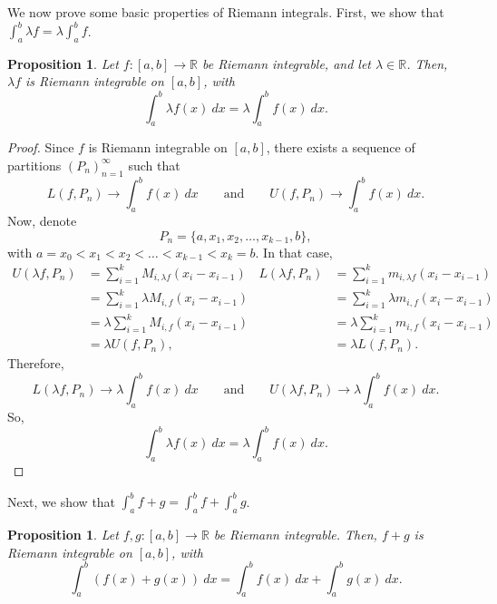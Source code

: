 \documentclass[a4paper, openany]{memoir}
\theoremstyle{definition}
\theoremstyle{plain}
\newtheorem{proposition}[definition]{Proposition}
\begin{document}
We now prove some basic properties of Riemann integrals. First, we show that $\int_a^b \lambda f = \lambda \int_a^b f$.
\begin{proposition}
Let $f: [a, b] \to \mathbb{R}$ be Riemann integrable, and let $\lambda \in \mathbb{R}$. Then, $\lambda f$ is Riemann integrable on $[a, b]$, with
\[\int_a^b \lambda f(x) \ dx = \lambda \int_a^b f(x) \ dx.\]
\end{proposition}
\begin{proof}
Since $f$ is Riemann integrable on $[a, b]$, there exists a sequence of partitions $(P_n)_{n=1}^{\infty}$ such that
\[L(f, P_n) \to \int_a^b f(x) \ dx \qquad \text{and} \qquad U(f, P_n) \to \int_a^b f(x) \ dx.\]
Now, denote
\[P_n = \{a, x_1, x_2, \dots, x_{k-1}, b\},\]
with $a = x_0 < x_1 < x_2 < \dots < x_{k-1} < x_k = b$. In that case,
\begin{align*}
    U(\lambda f, P_n) &= \sum_{i=1}^k M_{i, \lambda f} (x_i - x_{i-1}) & L(\lambda f, P_n) &= \sum_{i=1}^k m_{i, \lambda f} (x_i - x_{i-1}) \\
    &= \sum_{i=1}^k \lambda M_{i, f} (x_i - x_{i-1}) & &= \sum_{i=1}^k \lambda m_{i, f} (x_i - x_{i-1}) \\
    &= \lambda \sum_{i=1}^k M_{i, f} (x_i - x_{i-1}) & &= \lambda \sum_{i=1}^k m_{i, f} (x_i - x_{i-1}) \\
    &= \lambda U(f, P_n), & &= \lambda L(f, P_n).
\end{align*}
Therefore,
\[L(\lambda f, P_n) \to \lambda \int_a^b f(x) \ dx \qquad \text{and} \qquad U(\lambda f, P_n) \to \lambda \int_a^b f(x) \ dx.\]
So,
\[\int_a^b \lambda f(x) \ dx = \lambda \int_a^b f(x) \ dx.\]
\end{proof}
\noindent Next, we show that $\int_a^b f + g = \int_a^b f + \int_a^b g$.
\begin{proposition}
Let $f, g: [a, b] \to \mathbb{R}$ be Riemann integrable. Then, $f + g$ is Riemann integrable on $[a, b]$, with
\[\int_a^b (f(x) + g(x)) \ dx = \int_a^b f(x) \ dx + \int_a^b g(x) \ dx.\]
\end{proposition}
\end{document}
